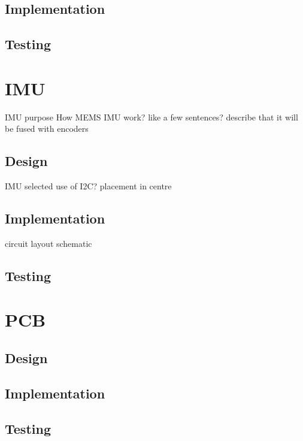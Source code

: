 \subsection{Implementation}\label{elec/encoder/impl}

\subsection{Testing}\label{elec/encoder/test}


\section{IMU}\label{elec/imu}
IMU purpose 
How MEMS IMU work? like a few sentences? 
describe that it will be fused with encoders

\subsection{Design}\label{elec/imu/design}
IMU selected 
use of I2C? 
placement in centre

\subsection{Implementation}\label{elec/imu/impl}
circuit layout
schematic

\subsection{Testing}\label{elec/imu/test}




\section{PCB}\label{elec/pcb}

\subsection{Design}\label{elec/pcb/design}

\subsection{Implementation}\label{elec/pcb/impl}

\subsection{Testing}\label{elec/pcb/test}

